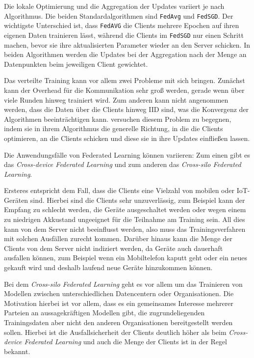 Die lokale Optimierung und die Aggregation der Updates variiert je nach Algorithmus. Die beiden Standardalgorithmen sind \texttt{FedAvg} und \texttt{FedSGD}\cite{mcmahan:2016}. Der wichtigste Unterschied ist, dass \texttt{FedAVG} die Clients mehrere Epochen auf ihren eigenen Daten trainieren lässt, während die Clients im \texttt{FedSGD} nur einen Schritt machen, bevor sie ihre aktualisierten Parameter wieder an den Server schicken. In beiden Algorithmen werden die Updates bei der Aggregation nach der Menge an Datenpunkten beim jeweiligen Client gewichtet.

Das verteilte Training kann vor allem zwei Probleme mit sich bringen. Zunächst kann der Overhead für die Kommunikation sehr groß werden, gerade wenn über viele Runden hinweg trainiert wird. Zum anderen kann nicht angenommen werden, dass die Daten über die Clients hinweg IID sind, was die Konvergenz der Algorithmen beeinträchtigen kann. \textcite{karimireddy:2020} versuchen diesem Problem zu begegnen, indem sie in ihrem Algorithmus die generelle Richtung, in die die Clients optimieren, an die Clients schicken und diese sie in ihre Updates einfließen lassen.

Die Anwendungsfälle von Federated Learning können variieren: Zum einen gibt es das \textit{Cross-device Federated Learning} und zum anderen das \textit{Cross-silo Federated Learning}\cite{kairouz:2021}. 

Ersteres entspricht dem Fall, dass die Clients eine Vielzahl von mobilen oder IoT-Geräten sind. Hierbei sind die Clients sehr unzuverlässig, zum Beispiel kann der Empfang zu schlecht werden, die Geräte ausgeschaltet werden oder wegen einem zu niedrigen Akkustand ungeeignet für die Teilnahme am Training sein. All dies kann von dem Server nicht beeinflusst werden, also muss das Trainingsverfahren mit solchen Ausfällen zurecht kommen. Darüber hinaus kann die Menge der Clients von dem Server nicht indiziert werden, da Geräte auch dauerhaft ausfallen können, zum Beispiel wenn ein Mobiltelefon kaputt geht oder ein neues gekauft wird und deshalb laufend neue Geräte hinzukommen können.

Bei dem \textit{Cross-silo Federated Learning} geht es vor allem um das Trainieren von Modellen zwischen unterschiedlichen Datencentern oder Organisationen. Die Motivation hierbei ist vor allem, dass es ein gemeinsames Interesse mehrerer Parteien an aussagekräftigen Modellen gibt, die zugrundeliegenden Trainingsdaten aber nicht den anderen Organisationen bereitgestellt werden sollen. Hierbei ist die Ausfallsicherheit der Clients deutlich höher als beim \textit{Cross-device Federated Learning} und auch die Menge der Clients ist in der Regel bekannt.

